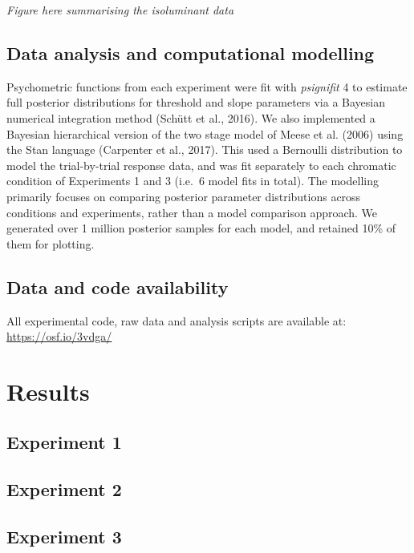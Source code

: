 \documentclass[
]{article}
\begin{document}
\emph{Figure here summarising the isoluminant data}

\hypertarget{data-analysis-and-computational-modelling}{%
\subsection{Data analysis and computational modelling}\label{data-analysis-and-computational-modelling}}

Psychometric functions from each experiment were fit with \emph{psignifit} 4 to estimate full posterior distributions for threshold and slope parameters via a Bayesian numerical integration method (Schütt et al., 2016). We also implemented a Bayesian hierarchical version of the two stage model of Meese et al. (2006) using the Stan language (Carpenter et al., 2017). This used a Bernoulli distribution to model the trial-by-trial response data, and was fit separately to each chromatic condition of Experiments 1 and 3 (i.e.~6 model fits in total). The modelling primarily focuses on comparing posterior parameter distributions across conditions and experiments, rather than a model comparison approach. We generated over 1 million posterior samples for each model, and retained 10\% of them for plotting.

\hypertarget{data-and-code-availability}{%
\subsection{Data and code availability}\label{data-and-code-availability}}

All experimental code, raw data and analysis scripts are available at: \url{https://osf.io/3vdga/}

\hypertarget{results}{%
\section{Results}\label{results}}

\hypertarget{experiment-1}{%
\subsection{Experiment 1}\label{experiment-1}}

\hypertarget{experiment-2}{%
\subsection{Experiment 2}\label{experiment-2}}

\hypertarget{experiment-3}{%
\subsection{Experiment 3}\label{experiment-3}}
\end{document}
